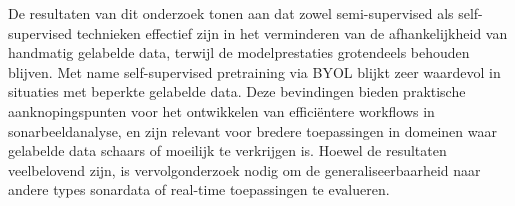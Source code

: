 \clearpage

De resultaten van dit onderzoek tonen aan dat zowel semi-supervised als self-supervised technieken effectief zijn in het verminderen van de afhankelijkheid van handmatig gelabelde data, terwijl de modelprestaties grotendeels behouden blijven. Met name self-supervised pretraining via BYOL blijkt zeer waardevol in situaties met beperkte gelabelde data. Deze bevindingen bieden praktische aanknopingspunten voor het ontwikkelen van efficiëntere workflows in sonarbeeldanalyse, en zijn relevant voor bredere toepassingen in domeinen waar gelabelde data schaars of moeilijk te verkrijgen is. Hoewel de resultaten veelbelovend zijn, is vervolgonderzoek nodig om de generaliseerbaarheid naar andere types sonardata of real-time toepassingen te evalueren.